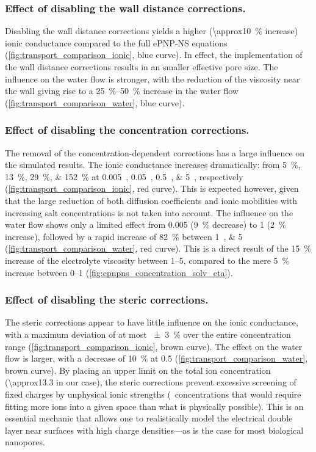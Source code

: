 %
\subsubsection{Effect of disabling the wall distance corrections.}
%

Disabling the wall distance corrections yields a higher (\SI{\approx10}{\percent} increase) ionic conductance
compared to the full {ePNP-NS} equations (\cref{fig:transport_comparison_ionic}, blue curve). In effect, the
implementation of the wall distance corrections results in an smaller effective pore size.  The influence on
the water flow is stronger, with the reduction of the viscosity near the wall giving rise to a
\SIrange{25}{50}{\percent} increase in the water flow (\cref{fig:transport_comparison_water}, blue curve).

%
\subsubsection{Effect of disabling the concentration corrections.}
%

The removal of the concentration-dependent corrections has a large influence on the simulated results. The
ionic conductance increases dramatically: from \SIlist{5;13;29;152}{\percent} at
\SIlist{0.005;0.05;0.5;5}{\Molar}, respectively (\cref{fig:transport_comparison_ionic}, red curve). This is
expected however, given that the large reduction of both diffusion coefficients and ionic mobilities with
increasing salt concentrations is not taken into account. The influence on the water flow shows only a limited
effect from \SI{0.005}{\Molar} (\SI{9}{\percent} decrease) to \SI{1}{\Molar} (\SI{2}{\percent} increase),
followed by a rapid increase of \SI{82}{\percent} between \SIlist{1;5}{\Molar}
(\cref{fig:transport_comparison_water}, red curve). This is a direct result of the \SI{15}{\percent} increase
of the electrolyte viscosity between \SIrange{1}{5}{\Molar}, compared to the mere \SI{5}{\percent} increase
between \SIrange{0}{1}{\Molar} (\cref{fig:epnpns_concentration_solv_eta}).

%
\subsubsection{Effect of disabling the steric corrections.}
%
The steric corrections appear to have little influence on the ionic conductance, with a maximum deviation of
at most \SI{\pm3}{\percent} over the entire concentration range (\cref{fig:transport_comparison_ionic}, brown
curve). The effect on the water flow is larger, with a decrease of \SI{10}{\percent} at \SI{0.5}{\Molar}
(\cref{fig:transport_comparison_water}, brown curve). By placing an upper limit on the total ion concentration
(\SI{\approx13.3}{\Molar} in our case), the steric corrections prevent excessive screening of fixed charges by
unphysical ionic strengths (\ie~concentrations that would require fitting more ions into a given space than
what is physically possible). This is an essential mechanic that allows one to realistically model the
electrical double layer near surfaces with high charge densities---as is the case for most biological
nanopores.


